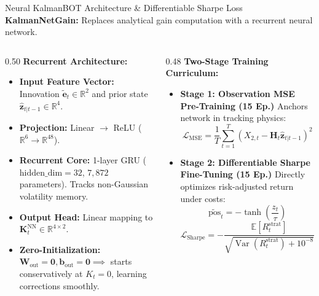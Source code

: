 \documentclass[10pt, aspectratio=169]{beamer}
\newcommand{\R}{\mathbb{R}}
\newcommand{\E}{\mathbb{E}}
\newcommand{\Var}{\operatorname{Var}}
\begin{document}
\begin{frame}{Neural KalmanBOT Architecture \& Differentiable Sharpe Loss}
  \textbf{KalmanNetGain:} Replaces analytical gain computation with a recurrent neural network.
  \vspace{4pt}
  \begin{columns}[T]
    \begin{column}{0.50\textwidth}
      \textbf{Recurrent Architecture:}
      \begin{itemize}
        \item \textbf{Input Feature Vector:} Innovation $\tilde{\bm{e}}_t \in \R^2$ and prior state $\hat{\bm{z}}_{t|t-1} \in \R^4$.
        \item \textbf{Projection:} Linear $\to$ ReLU ($\R^6 \to \R^{48}$).
        \item \textbf{Recurrent Core:} 1-layer GRU ($\text{hidden\_dim} = 32$, $7{,}872$ parameters). Tracks non-Gaussian volatility memory.
        \item \textbf{Output Head:} Linear mapping to $\bm{K}_t^{\text{NN}} \in \R^{4 \times 2}$.
        \item \textbf{Zero-Initialization:} $\bm{W}_{\text{out}} = \bm{0}, \bm{b}_{\text{out}} = \bm{0} \implies$ starts conservatively at $K_t = 0$, learning corrections smoothly.
      \end{itemize}
    \end{column}
    \begin{column}{0.48\textwidth}
      \textbf{Two-Stage Training Curriculum:}
      \begin{itemize}
        \item \textbf{Stage 1: Observation MSE Pre-Training (15 Ep.)}
        Anchors network in tracking physics:
        \[
          \mathcal{L}_{\text{MSE}} = \frac{1}{T}\sum_{t=1}^T \left(X_{2,t} - \bm{H}_t \hat{\bm{z}}_{t|t-1}\right)^2
        \]
        \item \textbf{Stage 2: Differentiable Sharpe Fine-Tuning (15 Ep.)}
        Directly optimizes risk-adjusted return under costs:
        \[
          \widetilde{\text{pos}}_t = -\tanh\left(\frac{z_t}{\tau}\right)
        \]
        \[
          \mathcal{L}_{\text{Sharpe}} = -\frac{\E[R_t^{\text{strat}}]}{\sqrt{\Var(R_t^{\text{strat}}) + 10^{-8}}} \times \sqrt{252}
        \]
      \end{itemize}
    \end{column}
  \end{columns}
\end{frame}
\end{document}
